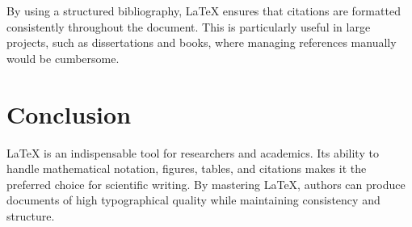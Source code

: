 By using a structured bibliography, LaTeX ensures that citations are formatted consistently throughout the document. This is particularly useful in large projects, such as dissertations and books, where managing references manually would be cumbersome.

\section{Conclusion}
LaTeX is an indispensable tool for researchers and academics. Its ability to handle mathematical notation, figures, tables, and citations makes it the preferred choice for scientific writing. By mastering LaTeX, authors can produce documents of high typographical quality while maintaining consistency and structure.

